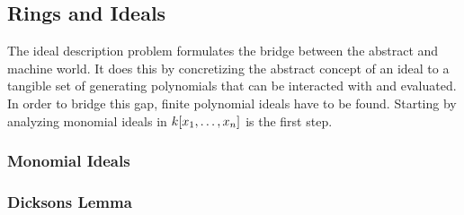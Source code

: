 \subsection{Rings and Ideals}
\label{ssec:rings-and-ideals}

The ideal description problem formulates the bridge between the abstract and machine world. It does this by concretizing the abstract concept of an ideal to a tangible set of generating polynomials that can be interacted with and evaluated. In order to bridge this gap, finite polynomial ideals have to be found. Starting by analyzing monomial ideals in $k\lbrack x_1, \dots, x_n \rbrack$ is the first step. 

\subsubsection{Monomial Ideals}
\label{sssec:monomial-ideals}

\subsubsection{Dicksons Lemma}
\label{sssec:dicksons-lemma}

